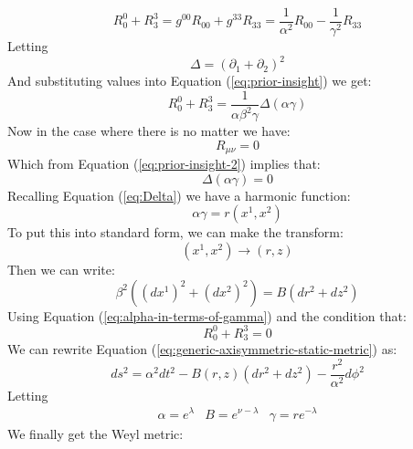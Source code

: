 \documentclass{article}
\begin{document}
\begin{equation}
R^{0}_{0}+R^{3}_{3}=g^{00}R_{00}+g^{33}R_{33}=\frac{1}{\alpha^{2}}R_{00}-\frac{1}{\gamma^{2}}R_{33}\label{eq:prior-insight}
\end{equation}
Letting
\begin{equation}
\Delta=\left(\partial_{1}+\partial_{2}\right)^{2}\label{eq:Delta}
\end{equation}
And substituting values into Equation (\ref{eq:prior-insight}) we get:
\begin{equation}
R^{0}_{0}+R^{3}_{3}=\frac{1}{\alpha\beta^{2}\gamma}\Delta\left(\alpha\gamma\right)\label{eq:prior-insight-2}
\end{equation}
Now in the case where there is no matter we have:
\begin{equation}
R_{\mu\nu}=0
\end{equation}
Which from Equation (\ref{eq:prior-insight-2}) implies that:
\begin{equation}
\Delta\left(\alpha\gamma\right)=0
\end{equation}
Recalling Equation (\ref{eq:Delta}) we have a harmonic function:
\begin{equation}
\alpha\gamma=r\left(x^{1},x^{2}\right)\label{eq:alpha-in-terms-of-gamma}
\end{equation}
To put this into standard form, we can make the transform:
\begin{equation}
\left(x^{1},x^{2}\right)\rightarrow\left(r,z\right)
\end{equation}
Then we can write:
\begin{equation}
\beta^{2}\left(\left(dx^{1}\right)^{2}+\left(dx^{2}\right)^{2}\right)=B\left(dr^{2}+dz^{2}\right)
\end{equation} 
Using Equation (\ref{eq:alpha-in-terms-of-gamma}) and the condition that:
\begin{equation}
R^{0}_{0}+R^{3}_{3}=0
\end{equation}
We can rewrite Equation (\ref{eq:generic-axisymmetric-static-metric}) as:
\begin{equation}
ds^{2}=\alpha^{2}dt^{2}-B\left(r,z\right)\left(dr^{2}+dz^{2}\right)-\frac{r^{2}}{\alpha^{2}}d\phi^{2}
\end{equation}
Letting
\begin{equation}
\begin{array}{ccc}
\alpha=e^{\lambda} & B=e^{\nu-\lambda} & \gamma=re^{-\lambda}
\end{array}
\end{equation}
We finally get the Weyl metric:
\end{document}
